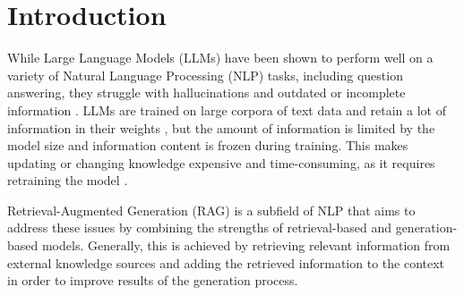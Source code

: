 \section{Introduction}

While Large Language Models (LLMs) have been shown to perform well on a variety of Natural Language Processing (NLP) tasks, including question answering, they struggle with hallucinations and outdated or incomplete information \cite{Marcus2020TheND}.
LLMs are trained on large corpora of text data and retain a lot of information in their weights \cite{petroni-etal-2019-language}, but the amount of information is limited by the model size and information content is frozen during training.
This makes updating or changing knowledge expensive and time-consuming, as it requires retraining the model \cite{realm}.

Retrieval-Augmented Generation (RAG) is a subfield of NLP that aims to address these issues by combining the strengths of retrieval-based and generation-based models.
Generally, this is achieved by retrieving relevant information from external knowledge sources and adding the retrieved information to the context in order to improve results of the generation process.
